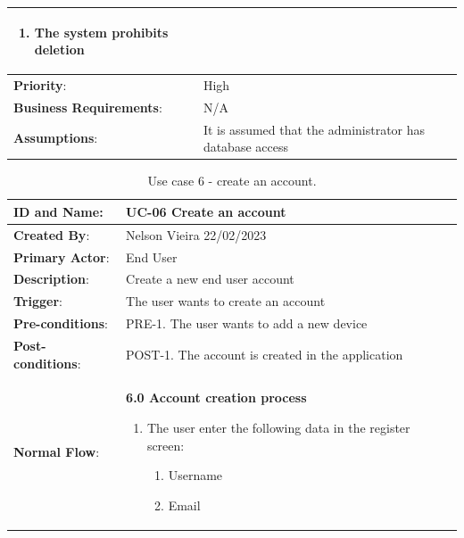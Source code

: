 \begin{table}[H]
\begin{adjustbox}{width=1.2\textwidth,center=\textwidth}
\begin{tabular}{|m{4cm}|m{12cm}|}
\begin{enumerate}
                \item The system prohibits deletion
            \end{enumerate} \\
            \hline
            \textbf{Priority}: & High \\
            \hline
            \textbf{Business Requirements}: & N/A \\
            \hline
            \textbf{Assumptions}: & It is assumed that the administrator has database access \\
            \hline
        \end{tabular}
    \end{adjustbox}
\end{table}

\begin{table}[H]
    \centering
    \caption{Use case 6 - create an account.}
    \label{table:use_case6}
    \vspace{1em}
    \begin{adjustbox}{width=1.2\textwidth,center=\textwidth}
        \begin{tabular}{|m{4cm}|m{12cm}|}
            \hline
            \textbf{ID and Name}: & UC-06 Create an account \\
            \hline
            \textbf{Created By}: & Nelson Vieira 22/02/2023 \\
            \hline
            \textbf{Primary Actor}: & End User \\
            \hline
            \textbf{Description}: & Create a new end user account \\
            \hline
            \textbf{Trigger}: & The user wants to create an account \\
            \hline
            \textbf{Pre-conditions}: & PRE-1. The user wants to add a new device \\
            \hline
            \textbf{Post-conditions}: & POST-1. The account is created in the application \\
            \hline
            \textbf{Normal Flow}: & \textbf{6.0 Account creation process}
            \begin{enumerate}
                \item The user enter the following data in the register screen:
                \begin{enumerate}
                    \item Username
                    \item Email

\end{enumerate}
\end{enumerate}
\end{tabular}
\end{adjustbox}
\end{table}

